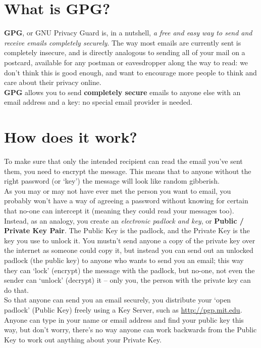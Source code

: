 
\section{What is GPG?}

\textbf{GPG}, or GNU Privacy Guard is, in a nutshell, \textit{a free and easy way to send and receive emails completely securely}. The way most emails are currently sent is completely insecure, and is directly analogous to sending all of your mail on a postcard, available for any postman or eavesdropper along the way to read: we don't think this is good enough, and want to encourage more people to think and care about their privacy online.\\
\textbf{GPG} allows you to send \textbf{completely secure} emails to anyone else with an email address and a key: no special email provider is needed.

\section{How does it work?}
To make sure that only the intended recipient can read the email you've sent them, you need to encrypt the message. This means that to anyone without the right password (or `key') the message will look like random gibberish. \\As you may or may not have ever met the person you want to email, you probably won't have a way of agreeing a password without knowing for certain that no-one can intercept it (meaning they could read your messages too). Instead, as an analogy, you create an \textit{electronic padlock and key}, or \textbf{Public / Private Key Pair}. The Public Key is the padlock, and the Private Key is the key you use to unlock it. You mustn't send anyone a copy of the private key over the internet as someone could copy it, but instead you can send out an unlocked padlock (the public key) to anyone who wants to send you an email; this way they can `lock' (encrypt) the message with the padlock, but no-one, not even the sender can `unlock' (decrypt) it -- only you, the person with the private key can do that.\\ So that anyone can send you an email securely, you distribute your `open padlock' (Public Key) freely using a Key Server, such as \href{http://pgp.mit.edu}{http://pgp.mit.edu}. Anyone can type in your name or email address and find your public key this way, but don't worry, there's no way anyone can work backwards from the Public Key to work out anything about your Private Key.

